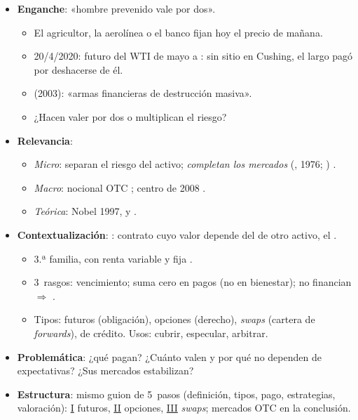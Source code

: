 \documentclass{article}
\begin{document}
\cabecerarepaso
\begin{columnas}

\begin{itemize}
\item \textbf{Enganche}: «hombre prevenido vale por dos».
  \begin{itemize}
  \item El agricultor, la aerolínea o el banco fijan hoy el precio de mañana.
  \item 20/4/2020: futuro del WTI de mayo a : sin sitio en Cushing, el largo pagó por deshacerse de él.
  \item {} (2003): «armas financieras de destrucción masiva».
  \item ¿Hacen valer por dos o multiplican el riesgo?
  \end{itemize}
\item \textbf{Relevancia}:
  \begin{itemize}
  \item \emph{Micro}: separan el riesgo del activo; \emph{completan los mercados} (, 1976; ) .
  \item \emph{Macro}: nocional OTC ; centro de 2008  .
  \item \emph{Teórica}: Nobel 1997,  y .
  \end{itemize}
\item \textbf{Contextualización}: : contrato cuyo valor depende del de otro activo, el .
  \begin{itemize}
  \item 3.ª familia, con renta variable  y fija .
  \item 3~rasgos: vencimiento; suma cero en pagos (no en bienestar); no financian $\Rightarrow$ .
  \item Tipos: futuros (obligación), opciones (derecho), \emph{swaps} (cartera de \emph{forwards}), de crédito. Usos: cubrir, especular, arbitrar.
  \end{itemize}
\item \textbf{Problemática}: ¿qué pagan? ¿Cuánto valen y por qué no dependen de expectativas? ¿Sus mercados estabilizan?
\item \textbf{Estructura}: mismo guion de 5~pasos (definición, tipos, pago, estrategias, valoración): \hyperref[rep:I]{I} futuros, \hyperref[rep:II]{II} opciones, \hyperref[rep:III]{III} \emph{swaps}; mercados OTC en la conclusión.

\end{itemize}
\end{columnas}
\end{document}

